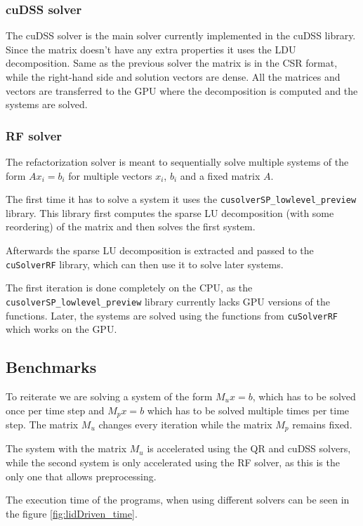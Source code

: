 \documentclass{article}
\begin{document}
\subsubsection{cuDSS solver}
The cuDSS solver is the main solver currently implemented in the cuDSS library. Since the matrix 
doesn't have any extra properties it uses the LDU decomposition. Same as the previous 
solver the matrix is in the CSR format, while the right-hand side and solution vectors
are dense. All the matrices and vectors are transferred to the GPU where the decomposition is 
computed and the systems are solved.
\subsubsection{RF solver}
The refactorization solver is meant to sequentially solve multiple systems of the form 
\(A x_i = b_i\) for multiple vectors \(x_i\), \(b_i\) and a fixed matrix \(A\). 

The first time 
it has to solve a system it uses the \verb|cusolverSP_lowlevel_preview| library. This library 
first computes the sparse LU decomposition (with some reordering) of the matrix and then solves the 
first system.

Afterwards the sparse LU  decomposition is extracted and passed to the \verb|cuSolverRF| library,
which can then use it to solve later systems.

The first iteration is done completely on the CPU, as the \verb|cusolverSP_lowlevel_preview| library
currently lacks GPU versions of the functions. Later, the systems are solved using the functions 
from \verb|cuSolverRF| which works on the GPU.

\subsection{Benchmarks}
To reiterate we are solving a system of the form \(M_u x = b\), which has to be solved once per time step
and \(M_p x = b\) which has to be solved multiple times per time step. The matrix \(M_u\) changes
every iteration while the matrix \(M_p\) remains fixed.

The system with the matrix \(M_u\) is accelerated using the QR and cuDSS solvers, while
the second system is only accelerated using the RF solver, as this is the only one that allows 
preprocessing. 

The execution time of the programs, when using different solvers can be seen in the
figure \ref{fig:lidDriven_time}.
\end{document}
